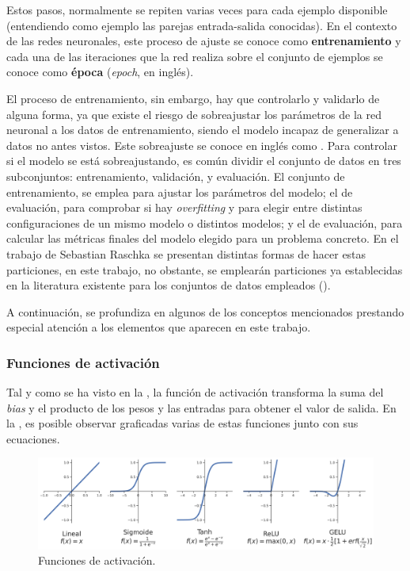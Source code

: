Estos pasos, normalmente se repiten varias veces para cada ejemplo disponible (entendiendo como ejemplo las parejas entrada-salida conocidas). En el contexto de las redes neuronales, este proceso de ajuste se conoce como \textbf{entrenamiento} y cada una de las iteraciones que la red realiza sobre el conjunto de ejemplos se conoce como \textbf{época} (\textit{epoch}, en inglés). 

El proceso de entrenamiento, sin embargo, hay que controlarlo y validarlo de alguna forma, ya que existe el riesgo de sobreajustar los parámetros de la red neuronal a los datos de entrenamiento, siendo el modelo incapaz de generalizar a datos no antes vistos. Este sobreajuste se conoce en inglés como . Para controlar si el modelo se está sobreajustando, es común dividir el conjunto de datos en tres subconjuntos: entrenamiento, validación, y evaluación. El conjunto de entrenamiento, se emplea para ajustar los parámetros del modelo; el de evaluación, para comprobar si hay \textit{overfitting} y para elegir entre distintas configuraciones de un mismo modelo o distintos modelos; y el de evaluación, para calcular las métricas finales del modelo elegido para un problema concreto. En el trabajo de Sebastian Raschka \cite{model-evaluation} se presentan distintas formas de hacer estas particiones, en este trabajo, no obstante, se emplearán particiones ya establecidas en la literatura existente para los conjuntos de datos empleados ().

A continuación, se profundiza en algunos de los conceptos mencionados prestando especial atención a los elementos que aparecen en este trabajo.

\subsubsection{Funciones de activación}
Tal y como se ha visto en la , la función de activación transforma la suma del \textit{bias} y el producto de los pesos y las entradas para obtener el valor de salida. En la , es posible observar graficadas varias de estas funciones junto con sus ecuaciones.

\begin{figure}[H]
\centering
\includegraphics[width=\linewidth]{imagenes/funciones_activacion.png} 
\captionsetup{width=.8\linewidth}
\caption{Funciones de activación.}
\label{fig:funciones-activacion}
\end{figure}

